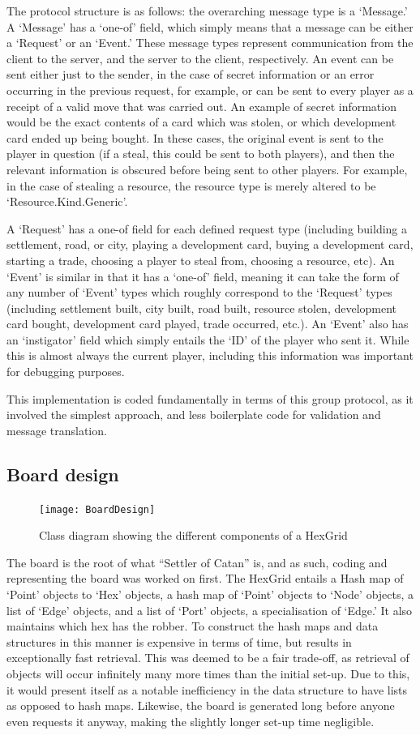 \documentclass[a4paper,doc,draftfirst]{apa6}
\begin{document}
The protocol structure is as follows: the overarching message type is a ‘Message.’ A ‘Message’ has a ‘one-of’ field, which simply means that a message can be either a ‘Request’ or an ‘Event.’ These message types represent communication from the client to the server, and the server to the client, respectively. An event can be sent either just to the sender, in the case of secret information or an error occurring in the previous request, for example, or can be sent to every player as a receipt of a valid move that was carried out. An example of secret information would be the exact contents of a card which was stolen, or which development card ended up being bought. In these cases, the original event is sent to the player in question (if a steal, this could be sent to both players), and then the relevant information is obscured before being sent to other players. For example, in the case of stealing a resource, the resource type is merely altered to be ‘Resource.Kind.Generic’.

A ‘Request’ has a one-of field for each defined request type (including building a settlement, road, or city, playing a development card, buying a development card, starting a trade, choosing a player to steal from, choosing a resource, etc). An ‘Event’ is similar in that it has a ‘one-of’ field, meaning it can take the form of any number of ‘Event’ types which roughly correspond to the ‘Request’ types (including settlement built, city built, road built, resource stolen, development card bought, development card played, trade occurred, etc.). An ‘Event’ also has an ‘instigator’ field which simply entails the ‘ID’ of the player who sent it. While this is almost always the current player, including this information was important for debugging purposes.

This implementation is coded fundamentally in terms of this group protocol, as it involved the simplest approach, and less boilerplate code for validation and message translation.

\subsection{Board design}
\begin{figure}[hbtp]
      \texttt{[image: BoardDesign]}
      \caption{Class diagram showing the different components of a HexGrid}
\end{figure}
The board is the root of what “Settler of Catan” is, and as such, coding and representing the board was worked on first. The HexGrid entails a Hash map of ‘Point’ objects to ‘Hex’ objects, a hash map of ‘Point’ objects to ‘Node’ objects, a list of ‘Edge’ objects, and a list of ‘Port’ objects, a specialisation of ‘Edge.’ It also maintains which hex has the robber. To construct the hash maps and data structures in this manner is expensive in terms of time, but results in exceptionally fast retrieval. This was deemed to be a fair trade-off, as retrieval of objects will occur infinitely many more times than the initial set-up. Due to this, it would present itself as a notable inefficiency in the data structure to have lists as opposed to hash maps. Likewise, the board is generated long before anyone even requests it anyway, making the slightly longer set-up time negligible.
\end{document}
